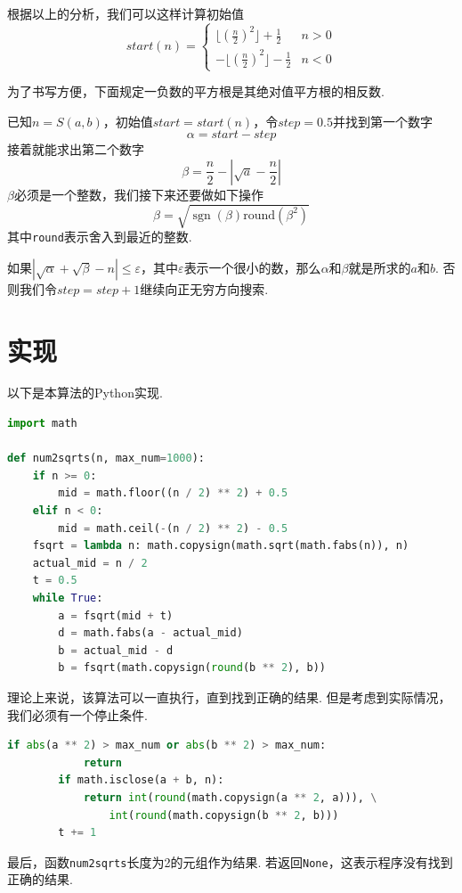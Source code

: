 \documentclass[a4paper, UTF8]{ctexart}
\DeclareMathOperator{\sgn}{\mathrm{sgn}}
\begin{document}
根据以上的分析，我们可以这样计算初始值
\[
    start(n)=
    \begin{cases}
        \lfloor(\frac{n}{2})^2\rfloor+\frac{1}{2}  &n>0 \\
        -\lfloor(\frac{n}{2})^2\rfloor-\frac{1}{2} &n<0
    \end{cases}
\]

为了书写方便，下面规定一负数的平方根是其绝对值平方根的相反数.

已知$n=S(a,b)$，初始值$start=start(n)$，令$step=0.5$并找到第一个数字\[\alpha=start-step\]接着就能求出第二个数字\[\beta=\frac{n}{2}-|\sqrt{a}-\frac{n}{2}|\]$\beta$必须是一个整数，我们接下来还要做如下操作\[\beta=\sqrt{\sgn(\beta)\mathrm{round}(\beta^2)}\]其中\verb|round|表示舍入到最近的整数.

如果$|\sqrt{\alpha}+\sqrt{\beta}-n|\leq\varepsilon$，其中$\varepsilon$表示一个很小的数，那么$\alpha$和$\beta$就是所求的$a$和$b$. 否则我们令$step=step+1$继续向正无穷方向搜索.

\section{实现}
以下是本算法的Python实现.

\begin{lstlisting}[language=python, name=example1]
import math

def num2sqrts(n, max_num=1000):
    if n >= 0:
        mid = math.floor((n / 2) ** 2) + 0.5
    elif n < 0:
        mid = math.ceil(-(n / 2) ** 2) - 0.5
    fsqrt = lambda n: math.copysign(math.sqrt(math.fabs(n)), n)
    actual_mid = n / 2
    t = 0.5
    while True:
        a = fsqrt(mid + t)
        d = math.fabs(a - actual_mid)
        b = actual_mid - d
        b = fsqrt(math.copysign(round(b ** 2), b))
\end{lstlisting}
理论上来说，该算法可以一直执行，直到找到正确的结果. 但是考虑到实际情况，我们必须有一个停止条件.
\begin{lstlisting}[language=python, name=example1]
        if abs(a ** 2) > max_num or abs(b ** 2) > max_num:
            return
        if math.isclose(a + b, n):
            return int(round(math.copysign(a ** 2, a))), \
                int(round(math.copysign(b ** 2, b)))
        t += 1
\end{lstlisting}
最后，函数\verb|num2sqrts|长度为2的元组作为结果. 若返回\verb|None|，这表示程序没有找到正确的结果.
\end{document}
